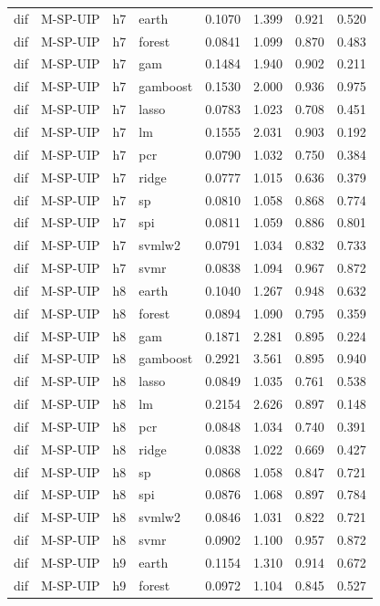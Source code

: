 \begin{ThreePartTable}
\begin{longtable}[t]{llclcccc}
dif & M-SP-UIP & h7 & earth & 0.1070 & 1.399 & 0.921 & 0.520\\
dif & M-SP-UIP & h7 & forest & 0.0841 & 1.099 & 0.870 & 0.483\\
dif & M-SP-UIP & h7 & gam & 0.1484 & 1.940 & 0.902 & 0.211\\
dif & M-SP-UIP & h7 & gamboost & 0.1530 & 2.000 & 0.936 & 0.975\\
dif & M-SP-UIP & h7 & lasso & 0.0783 & 1.023 & 0.708 & 0.451\\
dif & M-SP-UIP & h7 & lm & 0.1555 & 2.031 & 0.903 & 0.192\\
dif & M-SP-UIP & h7 & pcr & 0.0790 & 1.032 & 0.750 & 0.384\\
dif & M-SP-UIP & h7 & ridge & 0.0777 & 1.015 & 0.636 & 0.379\\
dif & M-SP-UIP & h7 & sp & 0.0810 & 1.058 & 0.868 & 0.774\\
dif & M-SP-UIP & h7 & spi & 0.0811 & 1.059 & 0.886 & 0.801\\
dif & M-SP-UIP & h7 & svmlw2 & 0.0791 & 1.034 & 0.832 & 0.733\\
dif & M-SP-UIP & h7 & svmr & 0.0838 & 1.094 & 0.967 & 0.872\\
\addlinespace
dif & M-SP-UIP & h8 & earth & 0.1040 & 1.267 & 0.948 & 0.632\\
dif & M-SP-UIP & h8 & forest & 0.0894 & 1.090 & 0.795 & 0.359\\
dif & M-SP-UIP & h8 & gam & 0.1871 & 2.281 & 0.895 & 0.224\\
dif & M-SP-UIP & h8 & gamboost & 0.2921 & 3.561 & 0.895 & 0.940\\
dif & M-SP-UIP & h8 & lasso & 0.0849 & 1.035 & 0.761 & 0.538\\
dif & M-SP-UIP & h8 & lm & 0.2154 & 2.626 & 0.897 & 0.148\\
dif & M-SP-UIP & h8 & pcr & 0.0848 & 1.034 & 0.740 & 0.391\\
dif & M-SP-UIP & h8 & ridge & 0.0838 & 1.022 & 0.669 & 0.427\\
dif & M-SP-UIP & h8 & sp & 0.0868 & 1.058 & 0.847 & 0.721\\
dif & M-SP-UIP & h8 & spi & 0.0876 & 1.068 & 0.897 & 0.784\\
dif & M-SP-UIP & h8 & svmlw2 & 0.0846 & 1.031 & 0.822 & 0.721\\
dif & M-SP-UIP & h8 & svmr & 0.0902 & 1.100 & 0.957 & 0.872\\
\addlinespace
dif & M-SP-UIP & h9 & earth & 0.1154 & 1.310 & 0.914 & 0.672\\
dif & M-SP-UIP & h9 & forest & 0.0972 & 1.104 & 0.845 & 0.527\\

\end{longtable}
\end{ThreePartTable}
